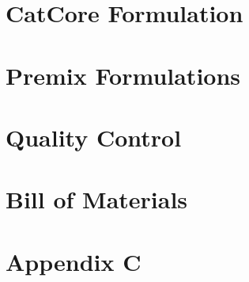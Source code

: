 \documentclass[11pt,oneside]{book}
\begin{document}
\frontmatter
\tableofcontents
\listoftables

\mainmatter

\chapter{CatCore Formulation}


\chapter{Premix Formulations}



\setcounter{chapter}{8}

\chapter{Quality Control}



\setcounter{chapter}{9}
\chapter{Bill of Materials}



\appendix
\setcounter{chapter}{2}
\chapter{Appendix C}

\end{document}
